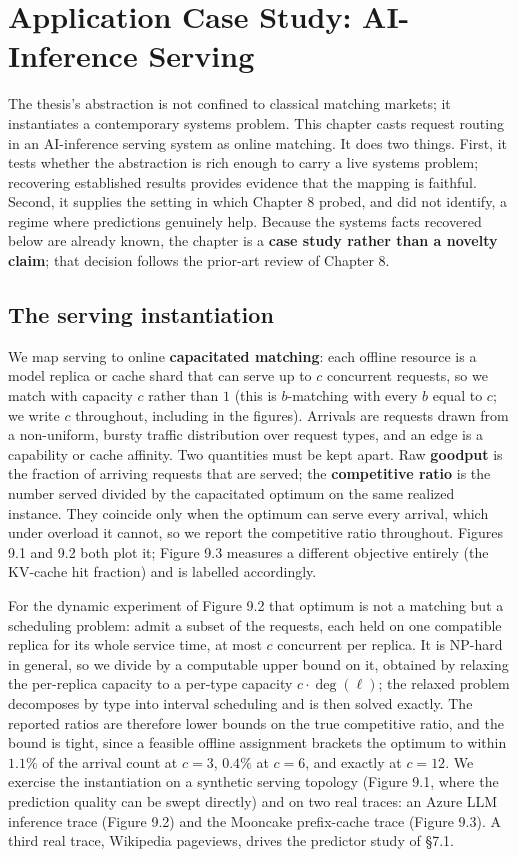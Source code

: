 \chapter{Application Case Study: AI-Inference
Serving}

The thesis's abstraction is not confined to classical matching markets;
it instantiates a contemporary systems problem. This chapter casts
request routing in an AI-inference serving system as online matching. It
does two things. First, it tests whether the abstraction is rich enough
to carry a live systems problem; recovering established results provides
evidence that the mapping is faithful. Second, it supplies the setting
in which Chapter 8 probed, and did not identify, a regime where
predictions genuinely help. Because the systems facts recovered below
are already known, the chapter is a \textbf{case study rather than a
novelty claim}; that decision follows the prior-art review of Chapter 8.

\section{The serving instantiation}

We map serving to online \textbf{capacitated matching}: each offline
resource is a model replica or cache shard that can serve up to \(c\)
concurrent requests, so we match with capacity \(c\) rather than \(1\)
(this is \(b\)-matching with every \(b\) equal to \(c\); we write \(c\)
throughout, including in the figures). Arrivals are requests drawn from
a non-uniform, bursty traffic distribution over request types, and an
edge is a capability or cache affinity. Two quantities must be kept
apart. Raw \textbf{goodput} is the fraction of arriving requests that
are served; the \textbf{competitive ratio} is the number served divided
by the capacitated optimum on the same realized instance. They coincide
only when the optimum can serve every arrival, which under overload it
cannot, so we report the competitive ratio throughout. Figures 9.1 and
9.2 both plot it; Figure 9.3 measures a different objective entirely
(the KV-cache hit fraction) and is labelled accordingly.

For the dynamic experiment of Figure 9.2 that optimum is not a matching
but a scheduling problem: admit a subset of the requests, each held on
one compatible replica for its whole service time, at most \(c\)
concurrent per replica. It is NP-hard in general, so we divide by a
computable upper bound on it, obtained by relaxing the per-replica
capacity to a per-type capacity \(c\cdot\deg(\ell)\); the relaxed
problem decomposes by type into interval scheduling and is then solved
exactly. The reported ratios are therefore lower bounds on the true
competitive ratio, and the bound is tight, since a feasible offline
assignment brackets the optimum to within \(1.1\%\) of the arrival count
at \(c=3\), \(0.4\%\) at \(c=6\), and exactly at \(c=12\). We exercise
the instantiation on a synthetic serving topology (Figure 9.1, where the
prediction quality can be swept directly) and on two real traces: an
Azure LLM inference trace (Figure 9.2) and the Mooncake prefix-cache
trace \autocite{mooncake2024} (Figure 9.3). A third real trace,
Wikipedia pageviews, drives the predictor study of §7.1.

